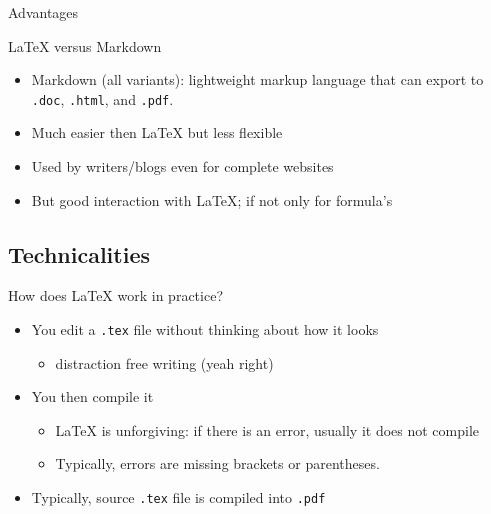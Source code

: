 \documentclass[ignorenonframetext]{beamer}
\begin{document}
{\begin{frame}{Advantages}
\end{frame}

\begin{frame}{\LaTeX{} versus Markdown}
	\begin{itemize}
		\item Markdown (all variants): lightweight markup language that can export to \texttt{.doc}, \texttt{.html}, and \texttt{.pdf}.
		\newline
		\item Much easier then \LaTeX{} but less flexible
		\newline
		\item Used by writers/blogs even for complete websites
		\newline
		\item But good interaction with \LaTeX{}; if not only for formula's
	\end{itemize}
\end{frame}

\subsection{Technicalities}\label{technicalities}

\begin{frame}[fragile]{How does \LaTeX{} work in practice?}

\begin{itemize}
\item
  You edit a \texttt{.tex} file without thinking about how it looks

  \begin{itemize}
  \item
    distraction free writing (yeah right)
    \newline
  \end{itemize}
\item
  You then compile it

  \begin{itemize}
  \item
    \LaTeX{} is unforgiving: if there is an error, usually it does not
    compile
  \item
    Typically, errors are missing brackets or parentheses.\newline
  \end{itemize}
\item
  Typically, source \texttt{.tex} file is compiled into \texttt{.pdf}
\end{itemize}

\end{frame}

}
\end{document}
